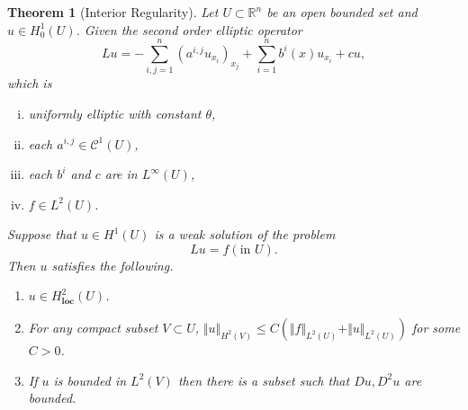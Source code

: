 \documentclass{article}
\newtheorem{theorem}{Theorem}[section]
\numberwithin{equation}{section}
\begin{document}
\begin{theorem}[Interior Regularity]
Let $U\subset \mathbb{R}^n$ be an open bounded set and $u\in H_0^1(U)$. Given the second order elliptic operator
\begin{equation*}
Lu = -\sum_{i,j=1}^n(a^{i,j}u_{x_i})_{x_j}+\sum_{i=1}^n b^i(x)u_{x_i}+cu,
\end{equation*}
which is 
\begin{enumerate}[i).]
\item uniformly elliptic with constant $\theta$,
\item each $a^{i,j}\in\mathcal{C}^1(U)$,
\item each $b^i$ and $c$ are in $L^\infty (U)$,
\item $f\in L^2(U)$. 
\end{enumerate}

Suppose that $u\in H^1(U)$ is a weak solution of the problem
\begin{equation*}
Lu = f (\text{in }U).
\end{equation*}
Then $u$ satisfies the following.
\begin{enumerate}[1).]
\item $u\in H_{\mathbf{loc}}^2(U)$.
\item For any compact subset $V\subset U$, $\Vert u\Vert_{H^2(V)}\leq C(\Vert f\Vert_{L^2(U)}+\Vert u\Vert_{L^2(U)})$ for some $C>0$.
\item If $u$ is bounded in $L^2(V)$ then there is a subset such that $Du, D^2u$ are bounded.
\end{enumerate}
\end{theorem}
\end{document}
